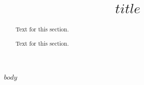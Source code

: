 \documentclass{bmcart}
\begin{document}
  \begin{frontmatter}

    \begin{fmbox}
      \title{$title$}

\author[addressref={aff1,aff22}, email={nolson@nist.gov}]{ %
     }
\author[addressref={aff2}]{ }
\author[addressref={aff3}]{ }
\author[addressref={aff2}]{ }
\author[addressref={aff3}]{ }
\author[addressref={aff1}]{ }
\author[addressref={aff4}]{ }
\author[addressref={aff2}]{ }


\address[id=aff1]{}
\address[id=aff2]{}
\address[id=aff3]{}
\address[id=aff4]{}
% 

    \end{fmbox}%

    \begin{abstractbox}

      \begin{abstract} %
        Text for this section.

        Text for this section.
      \end{abstract}

      \begin{keyword}
      \end{keyword}

    \end{abstractbox}

  \end{frontmatter}

  $body$
\end{document}
